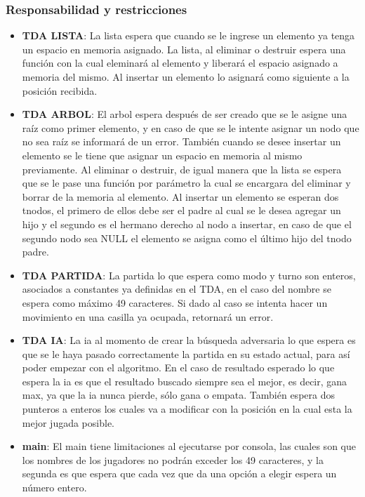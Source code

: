 \documentclass[12pt,a4paper]{article}
\begin{document}
\subsubsection{Responsabilidad y restricciones}
\begin{itemize}
    \item {\bf TDA LISTA}: La lista espera que cuando se le ingrese un elemento ya tenga un espacio en memoria asignado. La lista, al eliminar o destruir espera una funci\'on con la cual eleminar\'a al elemento y liberar\'a el espacio asignado a memoria del mismo. Al insertar un elemento lo asignar\'a como siguiente a la posici\'on recibida.
    \item {\bf TDA ARBOL}: El arbol espera despu\'es de ser creado que se le asigne una ra\'iz como primer elemento, y en caso de que se le intente asignar un nodo que no sea ra\'iz se informar\'a de un error. Tambi\'en cuando se desee insertar un elemento se le tiene que asignar un espacio en memoria al mismo previamente. Al eliminar o destruir, de igual manera que la lista se espera que se le pase una funci\'on por par\'ametro la cual se encargara del eliminar y borrar de la memoria al elemento. Al insertar un elemento se esperan dos tnodos, el primero de ellos debe ser el padre al cual se le desea agregar un hijo y el segundo es el hermano derecho al nodo a insertar, en caso de que el segundo nodo sea NULL el elemento se asigna como el \'ultimo hijo del tnodo padre.
    \item {\bf TDA PARTIDA}: La partida lo que espera como modo y turno son enteros, asociados a constantes ya definidas en el TDA, en el caso del nombre se espera como m\'aximo 49 caracteres. Si dado al caso se intenta hacer un movimiento en una casilla ya ocupada, retornar\'a un error.
    \item {\bf TDA IA}: La ia al momento de crear la b\'usqueda adversaria lo que espera es que se le haya pasado correctamente la partida en su estado actual, para as\'i poder empezar con el algoritmo. En el caso de resultado esperado lo que espera la ia es que el resultado buscado siempre sea el mejor, es decir, gana max, ya que la ia nunca pierde, s\'olo gana o empata. Tambi\'en espera dos punteros a enteros los cuales va a modificar con la posici\'on en la cual esta la mejor jugada posible.
    \item {\bf main}: El main tiene limitaciones al ejecutarse por consola, las cuales son que los nombres de los jugadores no podr\'an exceder los 49 caracteres, y la segunda es que espera que cada vez que da una opci\'on a elegir espera un n\'umero entero.
\end{itemize}
\end{document}
